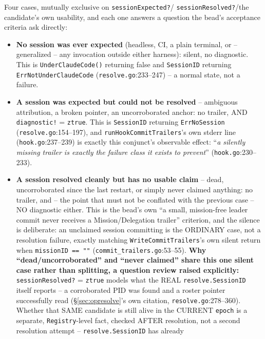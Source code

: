 \documentclass[a4paper,10pt,fleqn]{article}
\newcommand{\fpath}[1]{\texttt{#1}}
\newcommand{\field}[1]{\texttt{#1}}
\begin{document}
Four cases, mutually exclusive on \field{sessionExpected?}/
\field{sessionResolved?}/the candidate's own usability, and each one
answers a question the bead's acceptance criteria ask directly:

\begin{itemize}
  \item \textbf{No session was ever expected} (headless, CI, a plain
    terminal, or -- generalized -- any invocation outside either
    harness): silent, no diagnostic. This is \field{UnderClaudeCode()}
    returning false and \field{SessionID} returning
    \field{ErrNotUnderClaudeCode}
    (\fpath{resolve.go}:233--247) -- a normal state, not a failure.
  \item \textbf{A session was expected but could not be resolved} --
    ambiguous attribution, a broken pointer, an uncorroborated anchor:
    no trailer, AND \field{diagnostic!} = \field{ztrue}. This is
    \field{SessionID} returning \field{ErrNoSession}
    (\fpath{resolve.go}:154--197), and \field{runHookCommitTrailers}'s
    own stderr line (\fpath{hook.go}:237--239) is exactly this
    conjunct's observable effect: ``\emph{a silently missing trailer is
    exactly the failure class it exists to prevent}''
    (\fpath{hook.go}:230--233).
  \item \textbf{A session resolved cleanly but has no usable claim} --
    dead, uncorroborated since the last restart, or simply never
    claimed anything: no trailer, and -- the point that must not be
    conflated with the previous case -- NO diagnostic either. This is
    the bead's own ``a small, mission-free leader commit never receives
    a Mission/Delegation trailer'' criterion, and the silence is
    deliberate: an unclaimed session committing is the ORDINARY case,
    not a resolution failure, exactly matching
    \field{WriteCommitTrailers}'s own silent return when
    \field{missionID == ""} (\fpath{commit\_trailers.go}:53--55).
    \textbf{Why ``dead/uncorroborated'' and ``never claimed'' share this
    one silent case rather than splitting, a question review raised
    explicitly:} \field{sessionResolved?} = \field{ztrue} models what
    the REAL \field{resolve.SessionID} itself reports -- a corroborated
    PID was found and a roster pointer successfully read
    (\S\ref{sec:opresolve}'s own citation,
    \fpath{resolve.go}:278--360). Whether that SAME candidate is still
    alive in the CURRENT \field{epoch} is a separate,
    \field{Registry}-level fact, checked AFTER resolution, not a second
    resolution attempt -- \field{resolve.SessionID} has already

\end{itemize}
\end{document}

